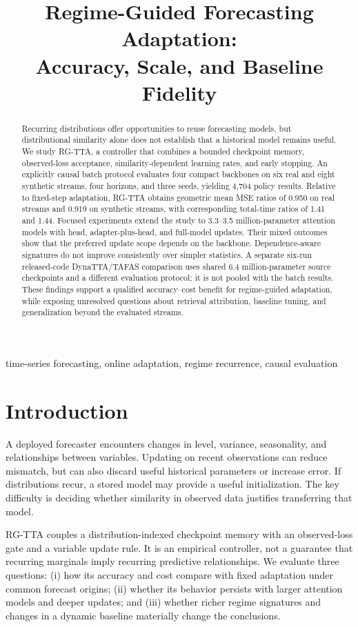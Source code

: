 \documentclass[conference]{IEEEtran}
\title{Regime-Guided Forecasting Adaptation:\\Accuracy, Scale, and Baseline Fidelity}
\author{\IEEEauthorblockN{Author 1, Author 2}}
\begin{document}
\maketitle
\begin{abstract}
Recurring distributions offer opportunities to reuse forecasting models, but distributional similarity alone does not establish that a historical model remains useful. We study RG-TTA, a controller that combines a bounded checkpoint memory, observed-loss acceptance, similarity-dependent learning rates, and early stopping. An explicitly causal batch protocol evaluates four compact backbones on six real and eight synthetic streams, four horizons, and three seeds, yielding 4,704 policy results. Relative to fixed-step adaptation, RG-TTA obtains geometric mean MSE ratios of 0.950 on real streams and 0.919 on synthetic streams, with corresponding total-time ratios of 1.41 and 1.44. Focused experiments extend the study to 3.3--3.5 million-parameter attention models with head, adapter-plus-head, and full-model updates. Their mixed outcomes show that the preferred update scope depends on the backbone. Dependence-aware signatures do not improve consistently over simpler statistics. A separate six-run released-code DynaTTA/TAFAS comparison uses shared 6.4 million-parameter source checkpoints and a different evaluation protocol; it is not pooled with the batch results. These findings support a qualified accuracy--cost benefit for regime-guided adaptation, while exposing unresolved questions about retrieval attribution, baseline tuning, and generalization beyond the evaluated streams.
\end{abstract}
\begin{IEEEkeywords}
time-series forecasting, online adaptation, regime recurrence, causal evaluation
\end{IEEEkeywords}

\section{Introduction}
A deployed forecaster encounters changes in level, variance, seasonality, and relationships between variables. Updating on recent observations can reduce mismatch, but can also discard useful historical parameters or increase error. If distributions recur, a stored model may provide a useful initialization. The key difficulty is deciding whether similarity in observed data justifies transferring that model.

RG-TTA couples a distribution-indexed checkpoint memory with an observed-loss gate and a variable update rule. It is an empirical controller, not a guarantee that recurring marginals imply recurring predictive relationships. We evaluate three questions: (i) how its accuracy and cost compare with fixed adaptation under common forecast origins; (ii) whether its behavior persists with larger attention models and deeper updates; and (iii) whether richer regime signatures and changes in a dynamic baseline materially change the conclusions.
\end{document}
